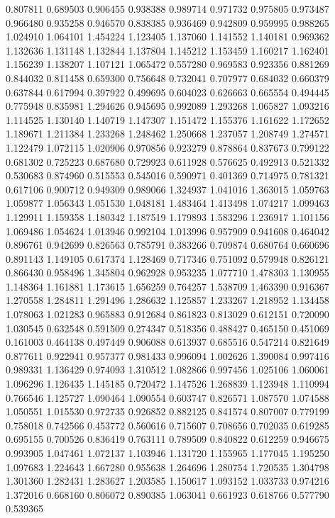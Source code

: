 0.807811
0.689503
0.906455
0.938388
0.989714
0.971732
0.975805
0.973487
0.966480
0.935258
0.946570
0.838385
0.936469
0.942809
0.959995
0.988265
1.024910
1.064101
1.454224
1.123405
1.137060
1.141552
1.140181
0.969362
1.132636
1.131148
1.132844
1.137804
1.145212
1.153459
1.160217
1.162401
1.156239
1.138207
1.107121
1.065472
0.557280
0.969583
0.923356
0.881269
0.844032
0.811458
0.659300
0.756648
0.732041
0.707977
0.684032
0.660379
0.637844
0.617994
0.397922
0.499695
0.604023
0.626663
0.665554
0.494445
0.775948
0.835981
1.294626
0.945695
0.992089
1.293268
1.065827
1.093216
1.114525
1.130140
1.140719
1.147307
1.151472
1.155376
1.161622
1.172652
1.189671
1.211384
1.233268
1.248462
1.250668
1.237057
1.208749
1.274571
1.122479
1.072115
1.020906
0.970856
0.923279
0.878864
0.837673
0.799122
0.681302
0.725223
0.687680
0.729923
0.611928
0.576625
0.492913
0.521332
0.530683
0.874960
0.515553
0.545016
0.590971
0.401369
0.714975
0.781321
0.617106
0.900712
0.949309
0.989066
1.324937
1.041016
1.363015
1.059763
1.059877
1.056343
1.051530
1.048181
1.483464
1.413498
1.074217
1.099463
1.129911
1.159358
1.180342
1.187519
1.179893
1.583296
1.236917
1.101156
1.069486
1.054624
1.013946
0.992104
1.013996
0.957909
0.941608
0.464042
0.896761
0.942699
0.826563
0.785791
0.383266
0.709874
0.680764
0.660696
0.891143
1.149105
0.617374
1.128469
0.717346
0.751092
0.579948
0.826121
0.866430
0.958496
1.345804
0.962928
0.953235
1.077710
1.478303
1.130955
1.148364
1.161881
1.173615
1.656259
0.764257
1.538709
1.463390
0.916367
1.270558
1.284811
1.291496
1.286632
1.125857
1.233267
1.218952
1.134458
1.078063
1.021283
0.965883
0.912684
0.861823
0.813029
0.612151
0.720090
1.030545
0.632548
0.591509
0.274347
0.518356
0.488427
0.465150
0.451069
0.161003
0.464138
0.497449
0.906088
0.613937
0.685516
0.547214
0.821649
0.877611
0.922941
0.957377
0.981433
0.996094
1.002626
1.390084
0.997416
0.989331
1.136429
0.974093
1.310512
1.082866
0.997456
1.025106
1.060061
1.096296
1.126435
1.145185
0.720472
1.147526
1.268839
1.123948
1.110994
0.766546
1.125727
1.090464
1.090554
0.603747
0.826571
1.087570
1.074588
1.050551
1.015530
0.972735
0.926852
0.882125
0.841574
0.807007
0.779199
0.758018
0.742566
0.453772
0.560616
0.715607
0.708656
0.702035
0.619285
0.695155
0.700526
0.836419
0.763111
0.789509
0.840822
0.612259
0.946675
0.993905
1.047461
1.072137
1.103946
1.131720
1.155965
1.177045
1.195250
1.097683
1.224643
1.667280
0.955638
1.264696
1.280754
1.720535
1.304798
1.301360
1.282431
1.283627
1.203585
1.150617
1.093152
1.033733
0.974216
1.372016
0.668160
0.806072
0.890385
1.063041
0.661923
0.618766
0.577790
0.539365
